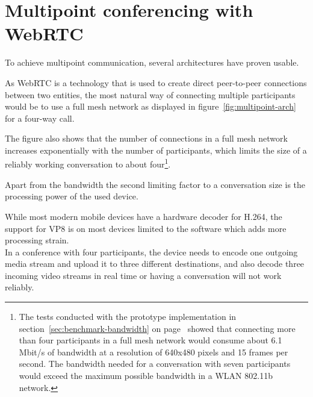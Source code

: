 \documentclass[../../../thesis.tex]{subfiles}
\begin{document}
\section{Multipoint conferencing with WebRTC}

To achieve multipoint communication, several architectures have proven usable.

As WebRTC is a technology that is used to create direct peer-to-peer connections between two entities, the most natural way of connecting multiple participants would be to use a full mesh network as displayed in figure~\ref{fig:multipoint-arch} for a four-way call.\par
The figure also shows that the number of connections in a full mesh network increases exponentially with the number of participants, which limits the size of a reliably working conversation to about four\footnote{The tests conducted with the prototype implementation in section~\ref{sec:benchmark-bandwidth} on page~\pageref{sec:benchmark-bandwidth} showed that connecting more than four participants in a full mesh network would consume about 6.1 Mbit/s of bandwidth at a resolution of 640x480 pixels and 15 frames per second. The bandwidth needed for a conversation with seven participants would exceed the maximum possible bandwidth in a WLAN 802.11b network.}.

Apart from the bandwidth the second limiting factor to a conversation size is the processing power of the used device.\par
While most modern mobile devices have a hardware decoder for H.264, the support for VP8 is on most devices limited to the software which adds more processing strain.\\

In a conference with four participants, the device needs to encode one outgoing media stream and upload it to three different destinations, and also decode three incoming video streams in real time or having a conversation will not work reliably.\\

\end{document}
